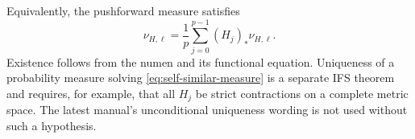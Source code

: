 Equivalently, the pushforward measure satisfies
\begin{equation}
\label{eq:self-similar-measure}
 \nu_{H,\ell}=\frac1p\sum_{j=0}^{p-1}(H_j)_*\nu_{H,\ell}.
\end{equation}
Existence follows from the numen and its functional equation.  Uniqueness of
a probability measure solving \cref{eq:self-similar-measure} is a separate
IFS theorem and requires, for example, that all $H_j$ be strict contractions
on a complete metric space.  The latest manual's unconditional uniqueness
wording is not used without such a hypothesis.

